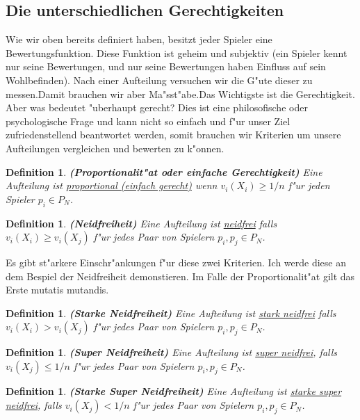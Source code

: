 \documentclass[11pt, a4paper, twoside]{article}
\newtheorem{defi}[satz]{Definition}
\numberwithin{equation}{section}
\begin{document}
\subsection{Die unterschiedlichen Gerechtigkeiten}
Wie wir oben bereits definiert haben, besitzt jeder Spieler eine Bewertungsfunktion. Diese Funktion ist geheim und subjektiv (ein Spieler kennt nur seine Bewertungen, und nur seine Bewertungen haben Einfluss auf sein Wohlbefinden). Nach einer Aufteilung versuchen wir die G"ute dieser zu messen.Damit brauchen wir aber Ma"sst"abe.Das Wichtigste ist die Gerechtigkeit. Aber was bedeutet "uberhaupt gerecht? Dies ist eine philosofische oder psychologische Frage und kann nicht so einfach und f"ur unser Ziel zufriedenstellend beantwortet werden, somit brauchen wir Kriterien um unsere Aufteilungen vergleichen und bewerten zu k"onnen.
\begin{defi}{\textbf{(Proportionalit"at oder einfache Gerechtigkeit)}}
\newline Eine Aufteilung ist \underline{proportional (einfach gerecht)} wenn $v_i(X_i) \geq 1/n$ f"ur jeden Spieler $p_i \in P_N$. 
\end{defi} 
\begin{defi}{\textbf{(Neidfreiheit)}}
\newline Eine Aufteilung ist \underline{neidfrei} falls $v_i(X_i) \geq v_i(X_j)$ f"ur jedes Paar von Spielern $p_i, p_j \in P_N$. 
\end{defi} 
Es gibt st"arkere Einschr"ankungen f"ur diese zwei Kriterien. Ich werde diese an dem Bespiel der Neidfreiheit demonstieren. Im Falle der Proportionalit"at gilt das Erste mutatis mutandis.
\begin{defi}{\textbf{(Starke Neidfreiheit)}}
\newline  Eine Aufteilung ist \underline{stark neidfrei} falls $v_i(X_i) > v_i(X_j)$ f"ur jedes Paar von Spielern $p_i, p_j \in P_N$.  
\end{defi} 
\begin{defi}{\textbf{(Super Neidfreiheit)}}
\newline Eine Aufteilung ist \underline{super neidfrei}, falls $v_i(X_j) \leq 1/n$  f"ur jedes Paar von Spielern $p_i, p_j \in P_N$. 
\end{defi} 
\begin{defi}{\textbf{(Starke Super Neidfreiheit)}}
\newline Eine Aufteilung ist \underline{starke super neidfrei}, falls $v_i(X_j) < 1/n$  f"ur jedes Paar von Spielern $p_i, p_j \in P_N$. 
\end{defi} 
\end{document}
